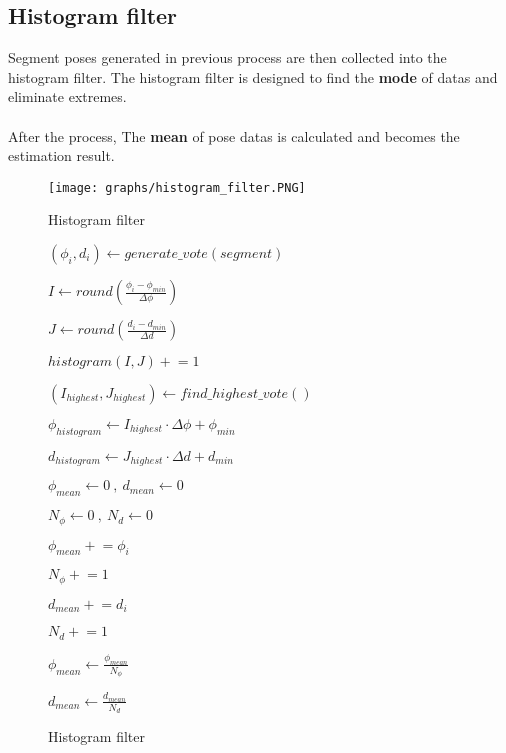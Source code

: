 \documentclass{article}
\begin{document}
\subsection{Histogram filter}

Segment poses generated in previous process are then collected into the histogram filter. The histogram filter is designed to find the \textbf{mode} of datas and eliminate extremes.
\\
\\
\noindent After the process, The \textbf{mean} of pose datas is calculated and becomes the estimation result.

\begin{figure}[ht]
  \label{fig:histogram_filter}
  \centering
  \texttt{[image: graphs/histogram\_filter.PNG]}
  \caption{Histogram filter}
\end{figure}
\FloatBarrier

\begin{figure} [ht]
\begin{algorithm}[H]
	 {
			$(\phi_i, d_i) \gets generate\_vote(segment)$
			
			$I \gets round(\frac{\phi_i - \phi_{min}}{\Delta\phi})$

			$J \gets round(\frac{d_i - d_{min}}{\Delta d})$
			
			$histogram(I, J) \mathrel{+}= 1$
	}
	
	$(I_{highest}, J_{highest}) \gets find \_ highest \_ vote()$	
	
	$\phi_{histogram} \gets I_{highest} \cdot \Delta \phi + \phi_{min}$
	
	$d_{histogram} \gets J_{highest} \cdot \Delta d + d_{min}$

	$\phi_{mean} \gets 0 \ , \  d_{mean} \gets 0$
	
	$N_{\phi} \gets 0 \ , \ N_{d} \gets 0$
	
	{
		{
			$\phi_{mean} \mathrel{+}= \phi_{i}$
			
			$N_{\phi} \mathrel{+}= 1$
		}
		
		{
			$d_{mean} \mathrel{+}= d_{i}$
			
			$N_{d} \mathrel{+}= 1$
		}
	}
	
	$\phi_{mean} \gets \frac{\phi_{mean}}{N_{\phi}}$
	
	$d_{mean} \gets \frac{d_{mean}}{N_{d}}$	
	\caption{Histogram filter}
\end{algorithm}
\end{figure}
\FloatBarrier
\end{document}
